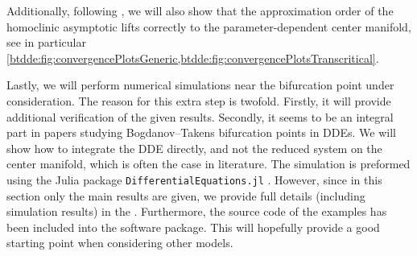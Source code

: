 Additionally, following \cite{Bosschaert@Interplay}, we will also show that the
approximation order of the homoclinic asymptotic lifts correctly to the
parameter-dependent center manifold, see in particular
\cref{btdde:fig:convergencePlotsGeneric,btdde:fig:convergencePlotsTranscritical}. 

Lastly, we will perform numerical simulations near the bifurcation point under
consideration. The reason for this extra step is twofold. Firstly, it will
provide additional verification of the given results. Secondly, it seems to be
an integral part in papers studying Bogdanov--Takens bifurcation points in
DDEs. We will show how to integrate the DDE directly, and not the reduced
system on the center manifold, which is often the case in literature. The
simulation is preformed using the Julia package {\tt DifferentialEquations.jl}
\cite{rackauckas2017differentialequations}. However, since in this section only
the main results are given, we provide full details (including simulation
results) in the \fi. Furthermore, the source
code of the examples has been included into the \DDEBIFTOOL software package.
This will hopefully provide a good starting point when considering other
models.

